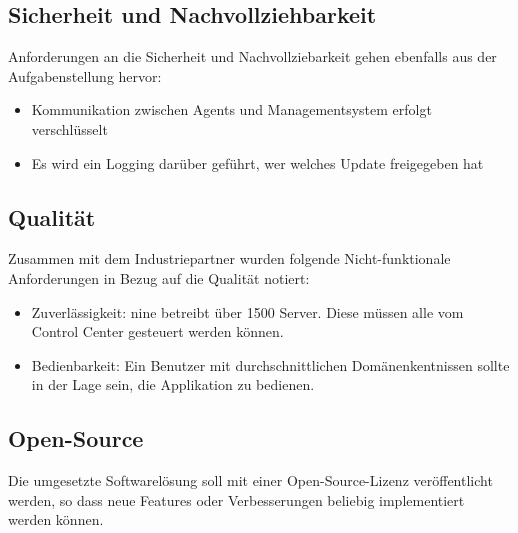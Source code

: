 \subsection*{Sicherheit und Nachvollziehbarkeit}
Anforderungen an die Sicherheit und Nachvollziebarkeit gehen ebenfalls aus der Aufgabenstellung hervor:

\begin{itemize}
\item Kommunikation zwischen Agents und Managementsystem erfolgt verschlüsselt
\item Es wird ein Logging darüber geführt, wer welches Update freigegeben hat
\end{itemize}

\subsection*{Qualität}

Zusammen mit dem Industriepartner wurden folgende Nicht-funktionale Anforderungen in Bezug auf die Qualität notiert:

\begin{itemize}
    \item Zuverlässigkeit: \gls{nine} betreibt über 1500 Server. Diese müssen alle vom Control Center gesteuert werden können.
    \item Bedienbarkeit: Ein Benutzer mit durchschnittlichen Domänenkentnissen sollte in der Lage sein, die Applikation zu bedienen.
\end{itemize}

\subsection*{Open-Source}

Die umgesetzte Softwarelösung soll mit einer Open-Source-Lizenz veröffentlicht werden, so dass neue Features oder Verbesserungen beliebig implementiert werden können.